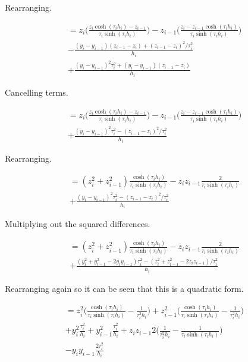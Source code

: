 \documentclass{article}
\begin{document}
Rearranging.

\begin{multline}
    = z_i\biggl( \frac{ z_i \cosh(\tau_i h_i) -z_{i-1} }{\tau_i \sinh(\tau_i h_i)} \biggr)
    - z_{i-1} \biggl(\frac{ z_i - z_{i-1} \cosh(\tau_i h_i) }{\tau_i \sinh(\tau_i h_i)} \biggr) \\
    - \frac{(y_i - y_{i-1})(z_{i-1} - z_i) +  (z_{i-1} - z_i)^2/\tau_i^2}{h_i}  \\
    + \frac{(y_i - y_{i-1})^2\tau_i^2 + (y_i - y_{i-1})(z_{i-1} - z_i)}{h_i} 
\end{multline}

Cancelling terms.

\begin{multline}
    = z_i\biggl( \frac{ z_i \cosh(\tau_i h_i) -z_{i-1} }{\tau_i \sinh(\tau_i h_i)} \biggr)
    - z_{i-1} \biggl(\frac{ z_i - z_{i-1} \cosh(\tau_i h_i) }{\tau_i \sinh(\tau_i h_i)} \biggr) \\
    + \frac{(y_i - y_{i-1})^2\tau_i^2 - (z_{i-1} - z_i)^2/\tau_i^2 }{h_i} 
\end{multline}

Rearranging.

\begin{multline}
    = (z_i^2 + z_{i-1}^2) \frac{\cosh(\tau_i h_i)}{\tau_i \sinh(\tau_i h_i)}
    -z_i z_{i-1} \frac{2}{\tau_i \sinh(\tau_i h_i)} \\
    + \frac{(y_i - y_{i-1})^2\tau_i^2 - (z_{i-1} - z_i)^2/\tau_i^2 }{h_i} 
\end{multline}

Multiplying out the squared differences.

\begin{multline}
    = (z_i^2 + z_{i-1}^2) \frac{\cosh(\tau_i h_i)}{\tau_i \sinh(\tau_i h_i)}
    -z_i z_{i-1} \frac{2}{\tau_i \sinh(\tau_i h_i)} \\
    + \frac{(y_i^2 + y_{i-1}^2 -2 y_i y_{i-1} )\tau_i^2 - (z_i^2 + z_{i-1}^2 - 2 z_i z_{i-1} )/\tau_i^2 }{h_i} 
\end{multline}

Rearranging again so it can be seen that this is a quadratic form.

\begin{multline}
    = z_i^2 \biggl( \frac{\cosh(\tau_i h_i)}{\tau_i \sinh(\tau_i h_i)} -
    \frac{1}{\tau_i^2 h_i} \biggr) 
    + z_{i-1}^2 \biggl( \frac{\cosh(\tau_i h_i)}{\tau_i \sinh(\tau_i h_i)} -
    \frac{1}{\tau_i^2 h_i} \biggr) \\
    + y_i^2 \frac{\tau_i^2}{h_i} + y_{i-1}^2 \frac{\tau_i^2}{h_i} 
    + z_i z_{i-1} 2 \biggl( \frac{1}{\tau_i^2 h_i} - \frac{1}{\tau_i \sinh(\tau_i h_i)} \biggr) \\
    - y_i y_{i-1} \frac{2 \tau_i^2}{h_i}
\end{multline}
\end{document}
